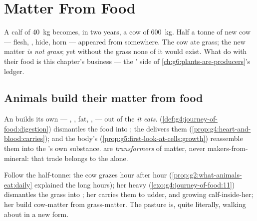 \chapter{Matter From Food}\label{ch:g6:matter-from-food}

A calf of \qty{40}{kg} becomes, in two years, a cow of
\qty{600}{kg}. Half a tonne of new cow --- flesh, , hide,
horn --- appeared from somewhere. The cow ate grass; the new
matter \emph{is not grass}; yet without the grass none of it
would exist. What  do with their food is this
chapter's business --- the ' side of
\cref{ch:g6:plants-are-producers}'s ledger.

\section{Animals build their matter from food}

\begin{proposition}\label{prop:g6:matter-from-food:transform}
An  builds its own  --- , ,
fat, ,  --- out of the \emph{ it
eats}.  (\cref{def:g4:journey-of-food:digestion})
dismantles the food into ; the  delivers them
(\cref{prop:g4:heart-and-blood:carries}); and the body's
 (\cref{prop:g5:first-look-at-cells:growth}) reassemble
them into the 's own substance.  are
\emph{transformers} of matter, never makers-from-mineral:
that trade belongs to the  alone.
\end{proposition}
\admitted

\begin{example}\label{ex:g6:matter-from-food:cow}
Follow the half-tonne: the cow grazes hour after hour
(\cref{prop:g2:what-animals-eat:daily} explained the long
hours); her heavy 
(\cref{exo:g4:journey-of-food:11}) dismantles the grass into
; her  carries them to udder,  and
growing calf-inside-her; her  build cow-matter from
grass-matter. The pasture is, quite literally, walking about
in a new form.
\end{example}

